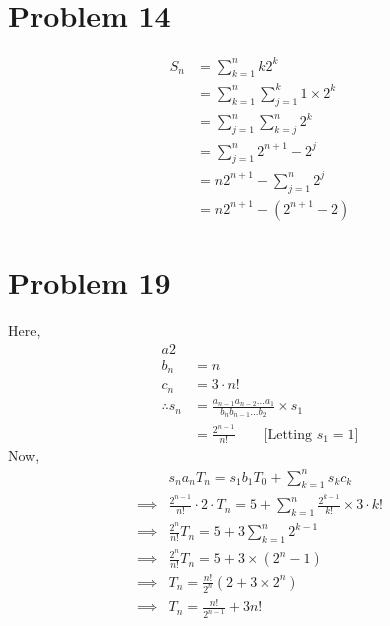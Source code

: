 \section*{Problem 14}
\begin{align*}
    S_n & = \sum_{k=1}^{n} k2^k                  \\
        & = \sum_{k=1}^n \sum_{j=1}^k 1\times2^k \\
        & =\sum_{j=1}^n \sum_{k=j}^n 2^k         \\
        & =\sum_{j=1}^n 2^{n+1}-2^j              \\
        & =n2^{n+1}-\sum_{j=1}^n 2^j             \\
        & =n2^{n+1}-(2^{n+1}-2)
\end{align*}
\section*{Problem 19}
Here,
\begin{align*}
    a  2                                                                               \\ b_n &= n\\ c_n &= 3\cdot n!\\
    \therefore s_n & = \frac{a_{n-1}a_{n-2}\ldots a_1}{b_nb_{n-1}\ldots b_2}\times s_1 \\
                   & =\frac{2^{n-1}}{n!} \qquad \text{[Letting $s_1=1$]}
\end{align*}
Now,
\begin{align*}
             & s_na_nT_n = s_1b_1T_0 + \sum_{k=1}^{n} s_kc_k                                         \\
    \implies & \frac{2^{n-1}}{n!}\cdot 2\cdot T_n= 5+\sum_{k=1}^n \frac{2^{k-1}}{k!}\times 3\cdot k! \\
    \implies & \frac{2^n}{n!}T_n = 5 + 3\sum_{k=1}^n{2^{k-1}}                                        \\
    \implies & \frac{2^n}{n!}T_n = 5 + 3 \times (2^n - 1)                                            \\
    \implies & T_n = \frac{n!}{2^n} (2 + 3\times 2^n)                                                \\
    \implies & T_n = \frac{n!}{2^{n-1}} + 3n!
\end{align*}

